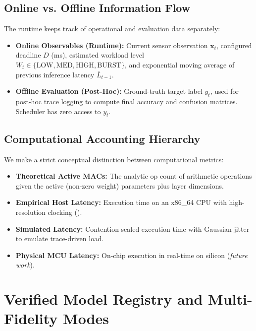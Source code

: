\documentclass[journal]{IEEEtran}
\begin{document}
\subsection{Online vs. Offline Information Flow}
The runtime keeps track of operational and evaluation data separately:
\begin{itemize}
    \item \textbf{Online Observables (Runtime):} Current sensor observation $\mathbf{x}_t$, configured deadline $D$ (ms), estimated workload level $W_t \in \{\text{LOW}, \text{MED}, \text{HIGH}, \text{BURST}\}$, and exponential moving average of previous inference latency $\bar{L}_{t-1}$.
    \item \textbf{Offline Evaluation (Post-Hoc):} Ground-truth target label $y_t$, used for post-hoc trace logging to compute final accuracy and confusion matrices. Scheduler has zero access to $y_t$.
\end{itemize}

\subsection{Computational Accounting Hierarchy}
We make a strict conceptual distinction between computational metrics:
\begin{itemize}
    \item \textbf{Theoretical Active MACs:} The analytic op count of arithmetic operations given the active (non-zero weight) parameters plus layer dimensions.
    \item \textbf{Empirical Host Latency:} Execution time on an x86\_64 CPU with high-resolution clocking ().
    \item \textbf{Simulated Latency:} Contention-scaled execution time with Gaussian jitter to emulate trace-driven load.
    \item \textbf{Physical MCU Latency:} On-chip execution in real-time on silicon (\textit{future work}).
\end{itemize}

\section{Verified Model Registry and Multi-Fidelity Modes}
\end{document}

